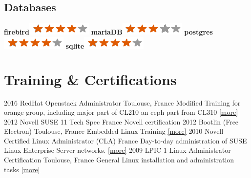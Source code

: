 \documentclass[]{friggeri-cv}
\begin{document}
\begin{aside}
    \section{Databases}
        \textbf{firebird}\includegraphics[scale=0.40]{img/4stars.png}
        \textbf{mariaDB}\includegraphics[scale=0.40]{img/3stars.png}
        \textbf{postgres}\includegraphics[scale=0.40]{img/4stars.png}
        \textbf{sqlite}\includegraphics[scale=0.40]{img/4stars.png}
        ~
\end{aside}
\section{Training \& Certifications}
\begin{entrylist}
    \entry
        {2016}
        {RedHat Openstack Administrator}
        {Toulouse, France}
        {Modified Training for orange group, including major part of CL210 an ceph part from CL310
	\href{https://www.redhat.com/fr/services/training/cl210-red-hat-openstack-administration}
	{[\underline{more}]}}
    \entry
        {2012}
        {Novell SUSE 11 Tech Spec}
        {France}
        {Novell certification}
    \entry
        {2012}
        {Bootlin (Free Electron)}
        {Toulouse, France}
        {Embedded Linux Training 
        \href{https://bootlin.com/training/embedded-linux/}{[\underline{more}]}}
    \entry
        {2010}
        {Novell Certified Linux Administrator (CLA)}
        {France}
        {Day-to-day administration of SUSE Linux Enterprise Server networks.
        \href{https://training.suse.com/certification/cla/cla-11/}{[\underline{more}]}}
    \entry
        {2009}
        {LPIC-1 Linux Administrator Certification}
        {Toulouse, France}
        {General Linux installation and administration tasks
        \href{http://www.lpi.org/our-certifications/lpic-1-overview}{[\underline{more}]}}
\end{entrylist}
\end{document}
